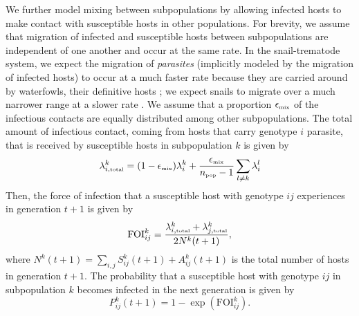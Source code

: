 \documentclass{article}\usepackage[]{graphicx}\usepackage[]{color}
\begin{document}
We further model mixing between subpopulations by allowing infected hosts to make contact with susceptible hosts in other populations.
For brevity, we assume that migration of infected and susceptible hosts between subpopulations are independent of one another and occur at the same rate.
In the snail-trematode system, we expect the migration of \emph{parasites} (implicitly modeled by the migration of infected hosts) to occur at a much faster rate because they are carried around by waterfowls, their definitive hosts \citep{lively1991experimental, ben2005spatial}; we expect snails to migrate over a much narrower range at a slower rate \citep{lively1999migration}.
We assume that a proportion $\epsilon_{\textrm{\tiny mix}}$ of the infectious contacts are equally distributed among other subpopulations.
The total amount of infectious contact, coming from hosts that carry genotype $i$ parasite, that is received by susceptible hosts in subpopulation $k$ is given by
\begin{equation}
\lambda_{i, \textrm{\tiny total}}^k = (1 - \epsilon_{\textrm{\tiny mix}}) \lambda_i^k + \frac{\epsilon_{\textrm{\tiny mix}}}{n_\textrm{\tiny pop}-1} \sum_{l \neq k} \lambda_i^l
\end{equation}
Then, the force of infection that a susceptible host with genotype $ij$ experiences in generation $t+1$ is given by
\begin{equation}
\mathrm{FOI}_{ij}^k = \frac{\lambda_{i, \textrm{\tiny total}}^k  + \lambda_{j, \textrm{\tiny total}}^k}{2 N^k(t+1)},
\end{equation}
where $N^k(t+1) = \sum_{i,j} S_{ij}^k(t+1) + A_{ij}^k(t+1)$ is the total number of hosts in generation $t+1$.
The probability that a susceptible host with genotype $ij$ in subpopulation $k$ becomes infected in the next generation is given by
\begin{equation}
P_{ij}^k(t+1) = 1 - \exp\left(\mathrm{FOI}_{ij}^k\right).
\end{equation}
\end{document}
